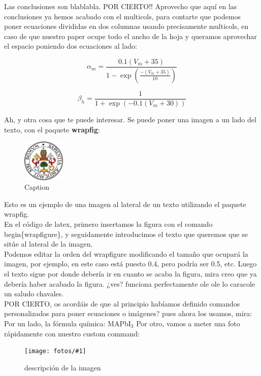 \documentclass[12pt,a4paper]{article}
\newcommand{\MA}{MAPbI$_3$}
\newcommand{\NEWPIC}[3]{
\begin{figure}[H]
    \centering
    \texttt{[image: fotos/\#1]}
    \caption{#3}
    \label{#1}
    \end{figure}
    }
\begin{document}
Las conclusiones son blablabla. POR CIERTO!! Aprovecho que aquí en las conclusiones ya hemos acabado con el multicols, para contarte que podemos poner ecuaciones divididas en dos columnas usando precisamente multicols, en caso de que nuestro paper ocupe todo el ancho de la hoja y queramos aprovechar el espacio poniendo dos ecuaciones al lado:

\begin{multicols}{2}
\begin{equation}
    \alpha_{m}=\frac{0.1(V_{m}+35)}{1-\exp(\frac{-(V_{m}+35)}{10})}
    \label{ec:alpha_m}
\end{equation}

\begin{equation}
    \beta_{h}=\frac{1}{1+\exp(-0.1(V_{m}+30))}
    \label{ec:beta_h}
\end{equation}
\end{multicols}

Ah, y otra cosa que te puede interesar. Se puede poner una imagen a un lado del texto, con el paquete \textbf{wrapfig}:

\begin{figure}
\centering
\includegraphics[width=2cm]{fotos/escudo.png}
\caption{Caption}
\end{figure}

Esto es un ejemplo de una imagen al lateral de un texto utilizando el paquete wrapfig.\\
En el código de latex, primero insertamos la figura con el comando begin\{wrapfigure\}, y seguidamente introducimos el texto que queremos que se sitúe al lateral de la imagen.\\
Podemos editar la orden del wrapfigure modificando el tamaño que ocupará la imagen, por ejemplo, en este caso está puesto 0.4, pero podría ser 0.5, etc. Luego el texto sigue por donde debería ir en cuanto se acaba la figura, mira creo que ya debería haber acabado la figura. ¿ves? funciona perfectamente ole ole lo caracole un saludo chavales.\\[0.5cm]
POR CIERTO, os acordáis de que al principio habíamos definido comandos personalizados para poner ecuaciones o imágenes? pues ahora los usamos, mira:\\
Por un lado, la fórmula química: {\MA}
Por otro, vamos a meter una foto rápidamente con nuestro custom command:
\NEWPIC{escudo}{0.5}{descripción de la imagen}
\end{document}
